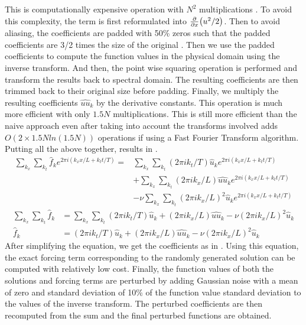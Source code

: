 This is computationally expensive operation with \(N^2\) multiplications \autocite{lariosMATH934BURGERS2021,robertsDealiasedConvolutionsPseudospectral2011,shenSpectralMethodsAlgorithms2011,orszagComparisonPseudospectralSpectral1972}. To avoid this complexity, the term is first reformulated into \(\pdv{x}(u^2/2)\). Then to avoid aliasing, the coefficients are padded with 50\% zeros such that the padded coefficients are 3/2 times the size of the original \autocite{orszagEliminationAliasingFiniteDifference1971, lariosMATH934BURGERS2021}. Then we use the padded coefficients to compute the function values in the physical domain using the inverse transform. And then, the point wise squaring operation is performed and transform the results back to spectral domain. The resulting coefficients are then trimmed back to their original size before padding. Finally, we multiply the resulting coefficients \(\hat{uu}_k\) by the derivative constants. This operation is much more efficient with only \(1.5 N\) multiplications. This is still more efficient than the naive approach even after taking into account the transforms involved adds \(O(2\times 1.5Nln(1.5N))\) operations if using a Fast Fourier Transform algorithm. Putting all the above together, results in .
\begin{equation}
  \begin{split}
    \sum_{k_{x}} \sum_{k_{t}} \hat{f}_k e^{2\pi i(k_{x}x/L+k_{t}t/T)} =
     & \sum_{k_{x}} \sum_{k_{t}} (2\pi i k_{t}/T) \hat{u}_k e^{2\pi i(k_{x}x/L+k_{t}t/T)}                                                                \\
     & + \sum_{k_{x}} \sum_{k_{t}} (2\pi i k_{x}/L)\hat{uu}_k e^{2\pi i(k_{x}x/L+k_{t}t/T)}                                                              \\
     & - \nu\sum_{k_{x}} \sum_{k_{t}} {(2\pi i k_{x}/L)}^2\hat{u}_k e^{2\pi i(k_{x}x/L+k_{t}t/T)} \label{eq:forced_viscous_burgers_fourier_substitution}
  \end{split}
\end{equation}
\begin{align}
  \sum_{k_{x}} \sum_{k_{t}} \hat{f}_k & = \sum_{k_{x}} \sum_{k_{t}} (2\pi i k_{t}/T) \hat{u}_k + (2\pi i k_{x}/L)\hat{uu}_k - \nu{(2\pi i k_{x}/L)}^2\hat{u}_k \label{eq:forced_viscous_burgers_fourier} \\
  \hat{f}_k                           & = (2\pi i k_{t}/T) \hat{u}_k + (2\pi i k_{x}/L)\hat{uu}_k - \nu{(2\pi i k_{x}/L)}^2\hat{u}_k \label{eq:forced_viscous_burgers_coeff}
\end{align}
After simplifying the equation, we get the coefficients as in . Using this equation, the exact forcing term corresponding to the randomly generated solution can be computed with relatively low cost. Finally, the function values of both the solutions and forcing terms are perturbed by adding Gaussian noise with a mean of zero and standard deviation of 10\% of the function value standard deviation to the values of the inverse transform. The perturbed coefficients are then recomputed from the sum and the final perturbed functions are obtained.

